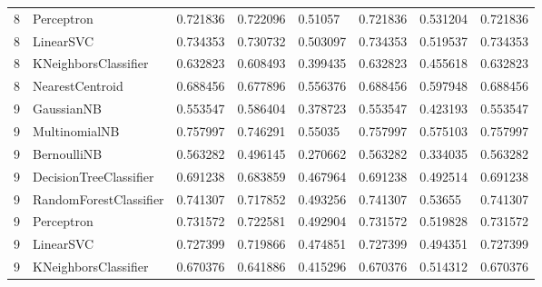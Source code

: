 \documentclass{article}
\begin{document}
\begin{table}[h]
\begin{tabular}{llllllll}
8             & Perceptron             & 0.721836          & 0.722096          & 0.51057               & 0.721836              & 0.531204                 & 0.721836                 \\
8             & LinearSVC              & 0.734353          & 0.730732          & 0.503097              & 0.734353              & 0.519537                 & 0.734353                 \\
8             & KNeighborsClassifier   & 0.632823          & 0.608493          & 0.399435              & 0.632823              & 0.455618                 & 0.632823                 \\
8             & NearestCentroid        & 0.688456          & 0.677896          & 0.556376              & 0.688456              & 0.597948                 & 0.688456                 \\
9             & GaussianNB             & 0.553547          & 0.586404          & 0.378723              & 0.553547              & 0.423193                 & 0.553547                 \\
9             & MultinomialNB          & 0.757997          & 0.746291          & 0.55035               & 0.757997              & 0.575103                 & 0.757997                 \\
9             & BernoulliNB            & 0.563282          & 0.496145          & 0.270662              & 0.563282              & 0.334035                 & 0.563282                 \\
9             & DecisionTreeClassifier & 0.691238          & 0.683859          & 0.467964              & 0.691238              & 0.492514                 & 0.691238                 \\
9             & RandomForestClassifier & 0.741307          & 0.717852          & 0.493256              & 0.741307              & 0.53655                  & 0.741307                 \\
9             & Perceptron             & 0.731572          & 0.722581          & 0.492904              & 0.731572              & 0.519828                 & 0.731572                 \\
9             & LinearSVC              & 0.727399          & 0.719866          & 0.474851              & 0.727399              & 0.494351                 & 0.727399                 \\
9             & KNeighborsClassifier   & 0.670376          & 0.641886          & 0.415296              & 0.670376              & 0.514312                 & 0.670376                 \\

\end{tabular}
\end{table}
\end{document}

